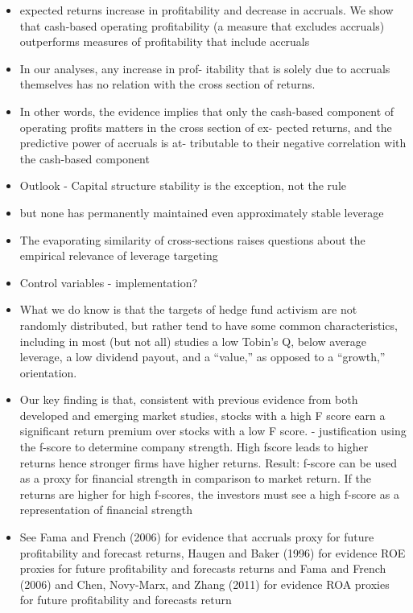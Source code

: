\documentclass[12pt]{article}
\begin{document}
    \begin{itemize}
        \item expected returns increase in profitability and decrease in accruals. We show that cash-based operating profitability (a measure that excludes accruals) outperforms measures of profitability that include accruals \citep{Ball2016}
        \item In our analyses, any increase in prof- itability that is solely due to accruals themselves has no relation with the cross section of returns.\citep{Ball2016}
        \item In other words, the evidence implies that only the cash-based component of operating profits matters in the cross section of ex- pected returns, and the predictive power of accruals is at- tributable to their negative correlation with the cash-based component \citep{Ball2016}
        \item Outlook - Capital structure stability is the exception, not the rule \citep{Deangelo2015}
        \item but none has permanently maintained even approximately stable leverage \citep{Deangelo2015}
        \item The evaporating similarity of cross-sections raises questions about the empirical relevance of leverage targeting \citep{Deangelo2015}
        \item Control variables - implementation?
        \item What we do know is that the targets of hedge fund activism are not randomly distributed, but rather tend to have some common characteristics, including in most (but not all) studies a low Tobin’s Q, below average leverage, a low dividend payout, and a “value,” as opposed to a “growth,” orientation. \citep{CoffeeJr.2014}
        \item Our key finding is that, consistent with previous evidence from both developed and emerging market studies, stocks with a high F score earn a significant return premium over stocks with a low F score. \citep{Hyde2014} - justification using the f-score to determine company strength. High fscore leads to higher returns hence stronger firms have higher returns. Result: f-score can be used as a proxy for financial strength in comparison to market return. If the returns are higher for high f-scores, the investors must see a high f-score as a representation of financial strength
        \item See Fama and French (2006) for evidence that accruals proxy for future profitability and forecast returns, Haugen and Baker (1996) for evidence ROE proxies for future profitability and forecasts returns and Fama and French (2006) and Chen, Novy-Marx, and Zhang (2011) for evidence ROA proxies for future profitability and forecasts return \citep{Choi2012}

\end{itemize}
\end{document}

